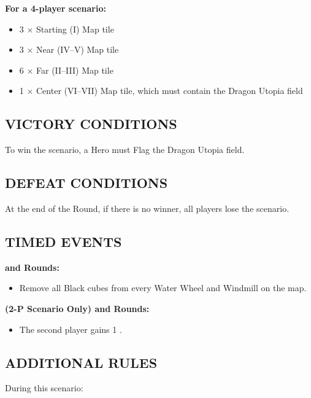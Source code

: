\begin{multicols*}{2}
\textbf{For a 4-player scenario:}
\begin{itemize}
  \item 3 × Starting (I) Map tile
  \item 3 × Near (IV--V) Map tile
  \item 6 × Far (II--III) Map tile
  \item 1 × Center (VI--VII) Map tile, which must contain the Dragon Utopia field
\end{itemize}

\subsection*{\MakeUppercase{Victory Conditions}}
To win the scenario, a Hero must Flag the Dragon Utopia field.

\subsection*{\MakeUppercase{Defeat Conditions}}
At the end of the  Round, if there is no winner, all players lose the scenario.

\subsection*{\MakeUppercase{Timed Events}}

\textbf{ and  Rounds:}
\begin{itemize}
  \item Remove all Black cubes from every Water Wheel and Windmill on the map.
\end{itemize}

\textbf{(2-P Scenario Only)  and  Rounds:}
\begin{itemize}
  \item The second player gains 1 .
\end{itemize}

\subsection*{\MakeUppercase{Additional Rules}}

During this scenario:


\end{multicols*}
